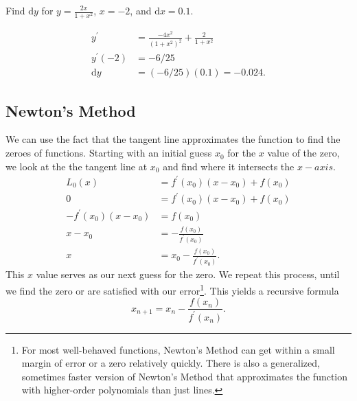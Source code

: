 \begin{example}
	Find $\mathrm{d}y$ for $y=\frac{2x}{1+x^2}$, $x=-2$, and $\mathrm{d}x = 0.1$.
\end{example}
\begin{align*}
	y^\prime &= \frac{-4x^2}{\left(1+x^2\right)^2} + \frac{2}{1+x^2} \\
	y^\prime(-2) &= -6/25 \\
	\mathrm{d}y &= (-6/25)(0.1) = -0.024.
\end{align*}

\subsection{Newton's Method}
We can use the fact that the tangent line approximates the function to find the zeroes of functions.
Starting with an initial guess $x_0$ for the $x$ value of the zero, we look at the the tangent line at $x_0$ and find where it intersects the $x-axis$.
\begin{align*}
	L_0(x) &= f^\prime(x_0)(x - x_0) + f(x_0) \\
	0 &= f^\prime(x_0)(x - x_0) + f(x_0) \\
	-f^\prime(x_0)(x - x_0) &= f(x_0) \\
	x - x_0 &= -\frac{f(x_0)}{f^\prime(x_0)} \\
	x &= x_0 - \frac{f(x_0)}{f^\prime(x_0)}.
\end{align*}
This $x$ value serves as our next guess for the zero.
We repeat this process, until we find the zero or are satisfied with our error\footnote{For most well-behaved functions, Newton's Method can get within a small margin of error or a zero relatively quickly. There is also a generalized, sometimes faster version of Newton's Method that approximates the function with higher-order polynomials than just lines.}.
This yields a recursive formula
\begin{equation*}
	x_{n+1} = x_n - \frac{f(x_n)}{f^\prime(x_n)}.
\end{equation*}
